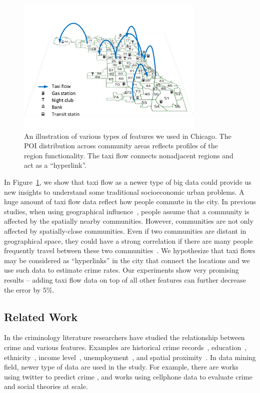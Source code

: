 \begin{figure}[t]
\centering
\includegraphics[width=0.8\textwidth]{fig/demo.pdf}
\caption{An illustration of various types of features we used in Chicago. The POI distribution across community areas reflects profiles of the region functionality. The taxi flow connects nonadjacent regions and act as a ``hyperlink''.}
\label{fig:demo}
\end{figure}



In Figure~\ref{fig:demo}, we show that taxi flow as a newer type of big data could provide us new insights to understand some traditional socioeconomic urban problems.  A huge amount of taxi flow data reflect how people commute in the city. In previous studies, when using geographical influence~\cite{Ans02}, people assume that a community is affected by the spatially nearby communities. However, communities are not only affected by spatially-close communities. Even if two communities are distant in geographical space, they could have a strong correlation if there are many people frequently travel between these two communities~\cite{GGM14}. We hypothesize that taxi flows may be considered as ``hyperlinks'' in the city that connect the locations and we use such data to estimate crime rates. Our experiments show very promising results --  adding taxi flow data on top of all other features can further decrease the error by 5\%.


\subsection{Related Work}


In the criminology literature researchers have studied the relationship between crime and various features. Examples are historical crime records~\cite{MSBS+12,WRWS13}, education~\cite{Ehrl75}, ethnicity~\cite{Brai89}, income level~\cite{Patt91}, unemployment~\cite{Free99}, and spatial proximity~\cite{Ans02}. 
In data mining field, newer type of data are used in the study. For example, there are works using twitter to predict crime \cite{WGB12,Gerb14}, and works using cellphone data \cite{TQC14,Bogo14} to evaluate crime and social theories at scale. 


